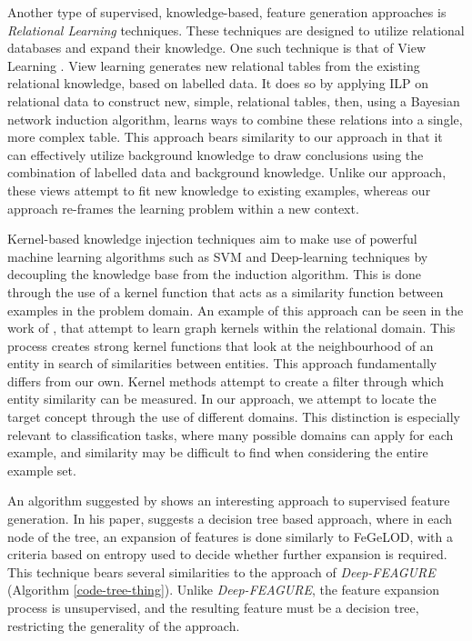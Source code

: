 \documentclass[twoside,11pt]{article}
\theoremstyle{definition}
\begin{document}
Another type of supervised, knowledge-based, feature generation approaches is \emph{Relational Learning} techniques. These techniques are designed to utilize relational databases and expand their knowledge. One such technique is that of View Learning . View learning generates new relational tables from the existing relational knowledge, based on labelled data.
It does so by applying ILP on relational data to construct new, simple, relational tables, then,  using a Bayesian network induction algorithm, learns ways to combine these relations into a single, more complex table.
This approach bears similarity to our approach in that it can effectively utilize background knowledge to draw conclusions using the combination of labelled data and background knowledge. Unlike our approach, these views attempt to fit new knowledge to existing examples, whereas our approach re-frames the learning problem within a new context.

Kernel-based knowledge injection techniques aim to make use of powerful machine learning algorithms such as SVM and Deep-learning techniques by decoupling the knowledge base from the induction algorithm. This is done through the use of a kernel function that acts as a similarity function between examples in the problem domain. An example of this approach can be seen in the work of , that attempt to learn graph kernels within the relational domain. This process creates strong kernel functions that look at the neighbourhood of an entity in search of similarities between entities. This  approach fundamentally differs from our own. Kernel methods attempt to create a filter through which entity similarity can be measured. In our approach, we attempt to locate the target concept through the use of different domains. This distinction is especially relevant to classification tasks, where many possible domains can apply for each example, and similarity may be difficult to find when considering the entire example set.

An algorithm suggested by  shows an interesting approach to supervised feature generation. In his paper,  suggests a decision tree based approach, where in each node of the tree, an expansion of features is done similarly to FeGeLOD, with a criteria based on entropy used to decide whether further expansion is required. This technique bears several similarities to the approach of \emph{Deep-FEAGURE} (Algorithm \ref{code-tree-thing}). Unlike \emph{Deep-FEAGURE}, the feature expansion process is unsupervised, and the resulting feature must be a decision tree, restricting the generality of the approach.
\end{document}
